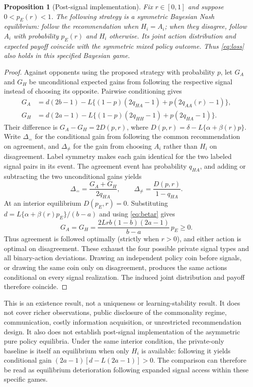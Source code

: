 \documentclass[11pt,a4paper]{article}
\newtheorem{proposition}[theorem]{Proposition}
\theoremstyle{definition}
\theoremstyle{remark}
\begin{document}
\begin{proposition}[Post-signal implementation]\label{prop:obedience}
Fix $r\in[0,1]$ and suppose $0<p_E(r)<1$. The following strategy is a symmetric Bayesian Nash equilibrium: follow the recommendation when $H_i=A_i$; when they disagree, follow $A_i$ with probability $p_E(r)$ and $H_i$ otherwise. Its joint action distribution and expected payoff coincide with the symmetric mixed policy outcome. Thus \eqref{eq:loss} also holds in this specified Bayesian game.
\end{proposition}
\begin{proof}
Against opponents using the proposed strategy with probability $p$, let $G_A$ and $G_H$ be unconditional expected gains from following the respective signal instead of choosing its opposite. Pairwise conditioning gives
\begin{align}
 G_A&=d(2b-1)-L\{(1-p)(2q_{HA}-1)+p(2q_{AA}(r)-1)\},\\
 G_H&=d(2a-1)-L\{(1-p)(2q_{HH}-1)+p(2q_{HA}-1)\}.
\end{align}
Their difference is $G_A-G_H=2D(p,r)$, where $D(p,r)=\delta-L\{\alpha+\beta(r)p\}$. Write $\Delta_{=}$ for the conditional gain from following the common recommendation on agreement, and $\Delta_{\ne}$ for the gain from choosing $A_i$ rather than $H_i$ on disagreement. Label symmetry makes each gain identical for the two labeled signal pairs in its event. The agreement event has probability $q_{HA}$, and adding or subtracting the two unconditional gains yields
\begin{equation}\label{eq:conditionalgains}
 \Delta_{=}=\frac{G_A+G_H}{2q_{HA}},\qquad
 \Delta_{\ne}=\frac{D(p,r)}{1-q_{HA}}.
\end{equation}
At an interior equilibrium $D(p_E,r)=0$. Substituting
$d=L\{\alpha+\beta(r)p_E\}/(b-a)$ and using \eqref{eq:betar} gives
\begin{equation}\label{eq:obedience}
 G_A=G_H=\frac{2Lrb(1-b)(2a-1)}{b-a}\,p_E\geq0.
\end{equation}
Thus agreement is followed optimally (strictly when $r>0$), and either action is optimal on disagreement. These exhaust the four possible private signal types and all binary-action deviations. Drawing an independent policy coin before signals, or drawing the same coin only on disagreement, produces the same actions conditional on every signal realization. The induced joint distribution and payoff therefore coincide.
\end{proof}
This is an existence result, not a uniqueness or learning-stability result. It does not cover richer observations, public disclosure of the commonality regime, communication, costly information acquisition, or unrestricted recommendation design. It also does not establish post-signal implementation of the asymmetric pure policy equilibria. Under the same interior condition, the private-only baseline is itself an equilibrium when only $H_i$ is available: following it yields conditional gain $(2a-1)[d-L(2a-1)]>0$. The comparison can therefore be read as equilibrium deterioration following expanded signal access within these specific games.
\end{document}
